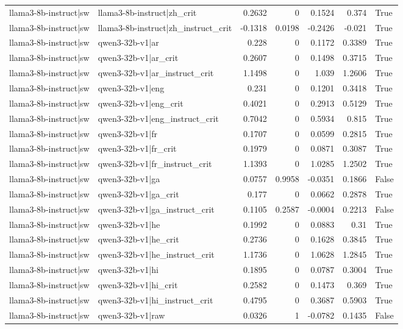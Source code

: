 \begin{table}
\begin{tabular}{l l r r r r l}
llama3-8b-instruct|sw & llama3-8b-instruct|zh_crit & 0.2632 & 0 & 0.1524 & 0.374 & True \\
llama3-8b-instruct|sw & llama3-8b-instruct|zh_instruct_crit & -0.1318 & 0.0198 & -0.2426 & -0.021 & True \\
llama3-8b-instruct|sw & qwen3-32b-v1|ar & 0.228 & 0 & 0.1172 & 0.3389 & True \\
llama3-8b-instruct|sw & qwen3-32b-v1|ar_crit & 0.2607 & 0 & 0.1498 & 0.3715 & True \\
llama3-8b-instruct|sw & qwen3-32b-v1|ar_instruct_crit & 1.1498 & 0 & 1.039 & 1.2606 & True \\
llama3-8b-instruct|sw & qwen3-32b-v1|eng & 0.231 & 0 & 0.1201 & 0.3418 & True \\
llama3-8b-instruct|sw & qwen3-32b-v1|eng_crit & 0.4021 & 0 & 0.2913 & 0.5129 & True \\
llama3-8b-instruct|sw & qwen3-32b-v1|eng_instruct_crit & 0.7042 & 0 & 0.5934 & 0.815 & True \\
llama3-8b-instruct|sw & qwen3-32b-v1|fr & 0.1707 & 0 & 0.0599 & 0.2815 & True \\
llama3-8b-instruct|sw & qwen3-32b-v1|fr_crit & 0.1979 & 0 & 0.0871 & 0.3087 & True \\
llama3-8b-instruct|sw & qwen3-32b-v1|fr_instruct_crit & 1.1393 & 0 & 1.0285 & 1.2502 & True \\
llama3-8b-instruct|sw & qwen3-32b-v1|ga & 0.0757 & 0.9958 & -0.0351 & 0.1866 & False \\
llama3-8b-instruct|sw & qwen3-32b-v1|ga_crit & 0.177 & 0 & 0.0662 & 0.2878 & True \\
llama3-8b-instruct|sw & qwen3-32b-v1|ga_instruct_crit & 0.1105 & 0.2587 & -0.0004 & 0.2213 & False \\
llama3-8b-instruct|sw & qwen3-32b-v1|he & 0.1992 & 0 & 0.0883 & 0.31 & True \\
llama3-8b-instruct|sw & qwen3-32b-v1|he_crit & 0.2736 & 0 & 0.1628 & 0.3845 & True \\
llama3-8b-instruct|sw & qwen3-32b-v1|he_instruct_crit & 1.1736 & 0 & 1.0628 & 1.2845 & True \\
llama3-8b-instruct|sw & qwen3-32b-v1|hi & 0.1895 & 0 & 0.0787 & 0.3004 & True \\
llama3-8b-instruct|sw & qwen3-32b-v1|hi_crit & 0.2582 & 0 & 0.1473 & 0.369 & True \\
llama3-8b-instruct|sw & qwen3-32b-v1|hi_instruct_crit & 0.4795 & 0 & 0.3687 & 0.5903 & True \\
llama3-8b-instruct|sw & qwen3-32b-v1|raw & 0.0326 & 1 & -0.0782 & 0.1435 & False \\

\end{tabular}
\end{table}
